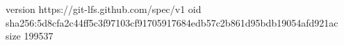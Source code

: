 version https://git-lfs.github.com/spec/v1
oid sha256:5d8cfa2c44ff5c3f97103cf91705917684edb57c2b861d95bdb19054afd921ac
size 199537
